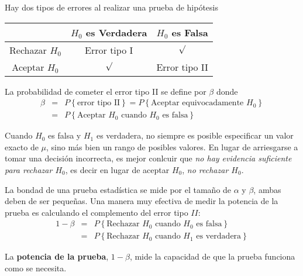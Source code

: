 \begin{frame}
\begin{frame}
Hay dos tipos de errores al realizar una prueba de hip\'otesis
\begin{center}
\begin{tabular}{c|cc}
& $H_{0}$ es Verdadera & $H_{0}$ es Falsa\\\hline\hline
Rechazar $H_{0}$ & Error tipo I & $\surd$\\
Aceptar $H_{0}$ & $\surd$ & Error tipo II
\end{tabular}
\end{center}
\begin{Def}
La probabilidad de cometer el error tipo II se define por $\beta$ donde
\begin{eqnarray*}
\beta&=&P\left\{\textrm{error tipo II}\right\}=P\left\{\textrm{Aceptar equivocadamente }H_{0}\right\}\\
&=&P\left\{\textrm{Aceptar }H_{0}\textrm{ cuando }H_{0}\textrm{ es falsa}\right\}
\end{eqnarray*}
\end{Def}







\begin{Note}
Cuando $H_{0}$ es falsa y $H_{1}$ es verdadera, no siempre es posible especificar un valor exacto de $\mu$, sino m\'as bien un rango de posibles valores.\medskip
En lugar de arriesgarse a tomar una decisi\'on incorrecta, es mejor conlcuir que \textit{no hay evidencia suficiente para rechazar $H_{0}$}, es decir en lugar de aceptar $H_{0}$, \textit{no rechazar $H_{0}$}.

\end{Note}






La bondad de una prueba estad\'istica se mide por el tama\~ no de $\alpha$ y $\beta$, ambas deben de ser peque\~ nas. Una manera muy efectiva de medir la potencia de la prueba es calculando el complemento del error tipo $II$:
\begin{eqnarray*}
1-\beta&= &P\left\{\textrm{Rechazar }H_{0}\textrm{ cuando }H_{0}\textrm{ es falsa}\right\}\\
&=&P\left\{\textrm{Rechazar }H_{0}\textrm{ cuando }H_{1}\textrm{ es verdadera}\right\}
\end{eqnarray*}
\begin{Def}
La \textbf{potencia de la prueba}, $1-\beta$, mide la capacidad de que la prueba funciona como se necesita.
\end{Def}








\end{frame}
\end{frame}
